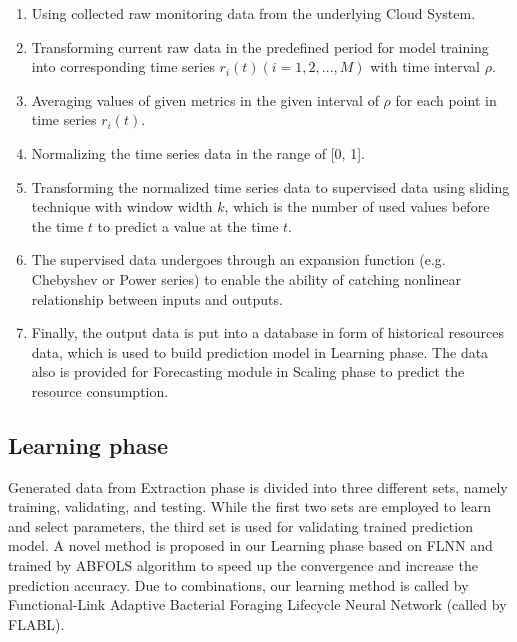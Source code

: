 \documentclass[runningheads]{llncs}
\begin{document}
\begin{enumerate}
	\item Using collected raw monitoring data from the underlying Cloud System. 
	\item Transforming current raw data in the predefined period for model training into corresponding time series $r_i(t) (i = 1, 2,..., M)$ with time interval $\rho$. 
	\item Averaging values of given metrics in the given interval of $\rho$ for each point in time series $r_i(t)$.
	\item Normalizing the time series data in the range of [0, 1]. 
	\item Transforming the normalized time series data to supervised data using sliding technique with window width $k$, which is the number of used values before the time $t$ to predict a value at the time $t$. 
	\item  
The supervised data undergoes through an expansion function (e.g. Chebyshev or Power series) to enable the ability of catching nonlinear relationship between inputs and outputs. 
	\item Finally, the output data is put into a database in form of historical resources data, which is used to build prediction model in Learning phase. The data also is provided for Forecasting module in Scaling phase to predict the resource consumption.
\end{enumerate}

\subsection{Learning phase}
\label{learning_phase}
Generated data from Extraction phase is divided into three different sets, namely training, validating, and testing. While the first two sets are employed to learn and select parameters, the third set is used for validating trained prediction model. 
A novel method is proposed in our Learning phase based on FLNN and trained by ABFOLS algorithm to speed up the convergence and increase the prediction accuracy. Due to combinations, our learning method is called by Functional-Link Adaptive Bacterial Foraging Lifecycle Neural Network (called by FLABL).
\end{document}

